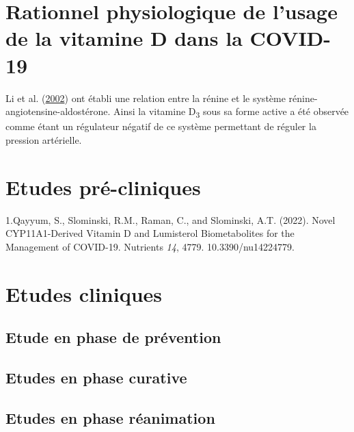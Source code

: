 \documentclass[
  a4paper,
  DIV=11,
  numbers=noendperiod,
  listof=totoc]{scrreprt}
\begin{document}
\hypertarget{rationnel-physiologique-de-lusage-de-la-vitamine-d-dans-la-covid-19}{%
\section{Rationnel physiologique de l'usage de la vitamine D dans la
COVID-19}\label{rationnel-physiologique-de-lusage-de-la-vitamine-d-dans-la-covid-19}}

Li et al. (\protect\hyperlink{ref-Li.2002}{2002}) ont établi une
relation entre la rénine et le système rénine-angiotensine-aldostérone.
Ainsi la vitamine D\textsubscript{3} sous sa forme active a été observée
comme étant un régulateur négatif de ce système permettant de réguler la
pression artérielle.

\hypertarget{etudes-pruxe9-cliniques}{%
\section{Etudes pré-cliniques}\label{etudes-pruxe9-cliniques}}

1.Qayyum, S., Slominski, R.M., Raman, C., and Slominski, A.T. (2022).
Novel CYP11A1-Derived Vitamin D and Lumisterol Biometabolites for the
Management of COVID-19. Nutrients \emph{14}, 4779. 10.3390/nu14224779.

\hypertarget{etudes-cliniques}{%
\section{Etudes cliniques}\label{etudes-cliniques}}

\hypertarget{etude-en-phase-de-pruxe9vention}{%
\subsection{Etude en phase de
prévention}\label{etude-en-phase-de-pruxe9vention}}

\hypertarget{etudes-en-phase-curative}{%
\subsection{Etudes en phase curative}\label{etudes-en-phase-curative}}

\hypertarget{etudes-en-phase-ruxe9animation}{%
\subsection{Etudes en phase
réanimation}\label{etudes-en-phase-ruxe9animation}}

\newpage{}
\end{document}
